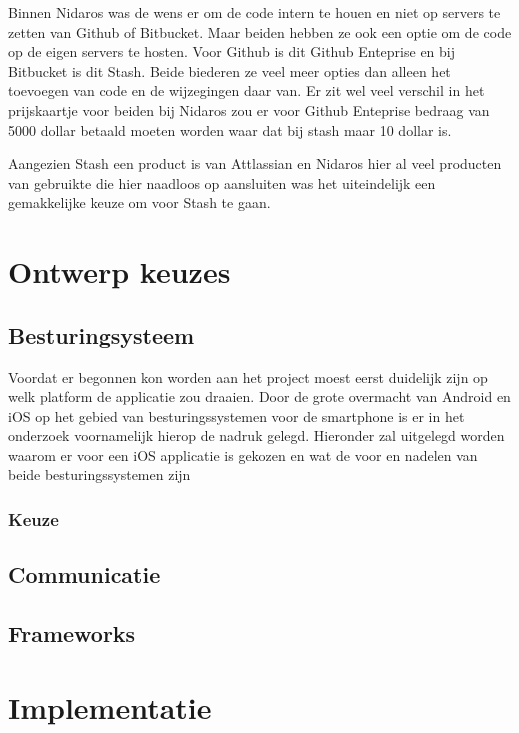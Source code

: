 \documentclass[a4paper,11pt,oneside]{report}
\begin{document}
Binnen Nidaros was de wens er om de code intern te houen en niet op servers te
zetten van Github of Bitbucket. Maar beiden hebben ze ook een optie om de code
op de eigen servers te hosten. Voor Github is dit Github Enteprise en bij
Bitbucket is dit Stash. Beide biederen ze veel meer opties dan alleen het
toevoegen van code en de wijzegingen daar van. Er zit wel veel verschil in het
prijskaartje voor beiden bij Nidaros zou er voor Github Enteprise bedraag van
5000 dollar betaald moeten worden waar dat bij stash maar 10 dollar is.

Aangezien Stash een product is van Attlassian en Nidaros hier al veel producten
van gebruikte die hier naadloos op aansluiten was het uiteindelijk een
gemakkelijke keuze om voor Stash te gaan.






\chapter{Ontwerp keuzes}

\section{Besturingsysteem}
Voordat er begonnen kon worden aan het project moest eerst duidelijk zijn op welk platform de applicatie zou draaien. Door de grote overmacht van Android en iOS op het gebied van besturingssystemen voor de smartphone is er in het onderzoek voornamelijk hierop de nadruk gelegd. Hieronder zal uitgelegd worden waarom er voor een iOS applicatie is gekozen en wat de voor en nadelen van beide besturingssystemen zijn


\subsection{Keuze}

\section{Communicatie}

\section{Frameworks}

\chapter{Implementatie}
\end{document}
